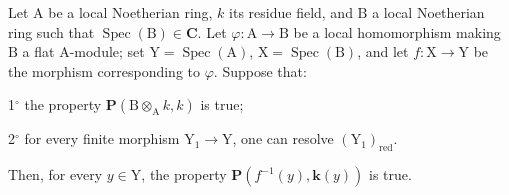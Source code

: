 \begin{proposition}[7.9.8]
\label{IV.7.9.8}
Let $\mathrm{A}$ be a local Noetherian ring, $k$ its residue field, and $\mathrm{B}$ a local Noetherian ring such that $\operatorname{Spec}(\mathrm{B})\in\boldsymbol{C}$. Let $\varphi:\mathrm{A}\to\mathrm{B}$ be a local homomorphism making $\mathrm{B}$ a flat $\mathrm{A}$-module; set $\mathrm{Y}=\operatorname{Spec}(\mathrm{A})$, $\mathrm{X}=\operatorname{Spec}(\mathrm{B})$, and let $f:\mathrm{X}\to\mathrm{Y}$ be the morphism corresponding to $\varphi$. Suppose that:

1${}^\circ$ the property $\boldsymbol{P}(\mathrm{B}\otimes_\mathrm{A} k,k)$ is true;

2${}^\circ$ for every finite morphism $\mathrm{Y}_1\to\mathrm{Y}$, one can resolve $(\mathrm{Y}_1)_{\mathrm{red}}$.

Then, for every $y\in\mathrm{Y}$, the property $\boldsymbol{P}(f^{-1}(y),\boldsymbol{k}(y))$ is true.
\end{proposition}

